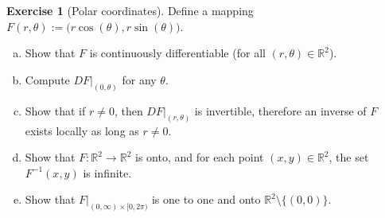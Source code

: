 \documentclass[12pt,openany]{book}
\newcommand{\R}{{\mathbb{R}}}
\theoremstyle{plain}
\theoremstyle{remark}
\theoremstyle{definition}
\newenvironment{exbox}{%
    \def\FrameCommand{\vrule width 1pt \relax\hspace {10pt}}%
    \MakeFramed {\advance \hsize -\width \FrameRestore }%
}{%
    \endMakeFramed
}
\newenvironment{exparts}{%
    \leavevmode\begin{enumerate}[a),noitemsep,topsep=0pt,parsep=0pt,partopsep=0pt]
}{%
    \end{enumerate}
}
\theoremstyle{exercise}
\newtheorem{exercise}{Exercise}[section]
\theoremstyle{example}
\begin{document}
\begin{exbox}
\begin{exercise}[Polar coordinates] \label{mv:exercise:polarcoordinates}
Define a mapping $F(r,\theta) := \bigl(r \cos(\theta), r \sin(\theta) \bigr)$.
\begin{exparts}
\item
Show that $F$ is continuously differentiable (for all $(r,\theta) \in
\R^2$).
\item
Compute $DF|_{(0,\theta)}$ for any $\theta$.
\item
Show that if $r \not= 0$, then $DF|_{(r,\theta)}$ is invertible, therefore an
inverse of $F$ exists locally as long as $r \not= 0$.
\item
Show that $F \colon \R^2 \to \R^2$ is onto, and for each point $(x,y) \in
\R^2$, the set $F^{-1}(x,y)$ is infinite.
\item
Show that $F|_{(0,\infty) \times [0,2\pi)}$ is one to one and onto
$\R^2 \setminus \bigl\{ (0,0) \bigr\}$.
\end{exparts}
\end{exercise}
\end{exbox}


\def\myDOI#1{\href{http://dx.doi.org/#1}{#1}}
\end{document}
